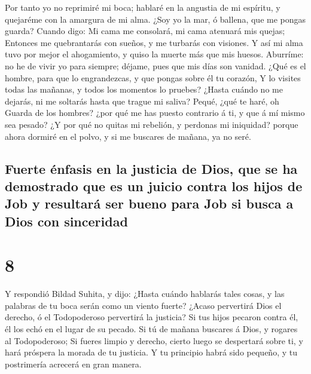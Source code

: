  Por tanto yo no reprimiré mi boca; hablaré en la angustia
de mi espíritu, y quejaréme con la amargura de mi alma. 
¿Soy yo la mar, ó ballena, que me pongas guarda?  Cuando
digo: Mi cama me consolará, mi cama atenuará mis quejas; 
Entonces me quebrantarás con sueños, y me turbarás con visiones.
 Y así mi alma tuvo por mejor el ahogamiento, y quiso la
muerte más que mis huesos.  Aburríme: no he de vivir yo
para siempre; déjame, pues que mis días son vanidad.  ¿Qué
es el hombre, para que lo engrandezcas, y que pongas sobre él tu
corazón,  Y lo visites todas las mañanas, y todos los
momentos lo pruebes?  ¿Hasta cuándo no me dejarás, ni me
soltarás hasta que trague mi saliva?  Pequé, ¿qué te haré,
oh Guarda de los hombres? ¿por qué me has puesto contrario á ti, y que á
mí mismo sea pesado?  ¿Y por qué no quitas mi rebelión, y
perdonas mi iniquidad? porque ahora dormiré en el polvo, y si me
buscares de mañana, ya no seré.

\hypertarget{fuerte-uxe9nfasis-en-la-justicia-de-dios-que-se-ha-demostrado-que-es-un-juicio-contra-los-hijos-de-job-y-resultaruxe1-ser-bueno-para-job-si-busca-a-dios-con-sinceridad}{%
\subsection{Fuerte énfasis en la justicia de Dios, que se ha demostrado
que es un juicio contra los hijos de Job y resultará ser bueno para Job
si busca a Dios con
sinceridad}\label{fuerte-uxe9nfasis-en-la-justicia-de-dios-que-se-ha-demostrado-que-es-un-juicio-contra-los-hijos-de-job-y-resultaruxe1-ser-bueno-para-job-si-busca-a-dios-con-sinceridad}}

\hypertarget{section-7}{%
\section{8}\label{section-7}}

 Y respondió Bildad Suhita, y dijo:  ¿Hasta
cuándo hablarás tales cosas, y las palabras de tu boca serán como un
viento fuerte?  ¿Acaso pervertirá Dios el derecho, ó el
Todopoderoso pervertirá la justicia?  Si tus hijos pecaron
contra él, él los echó en el lugar de su pecado.  Si tú de
mañana buscares á Dios, y rogares al Todopoderoso;  Si
fueres limpio y derecho, cierto luego se despertará sobre ti, y hará
próspera la morada de tu justicia.  Y tu principio habrá
sido pequeño, y tu postrimería acrecerá en gran manera.

